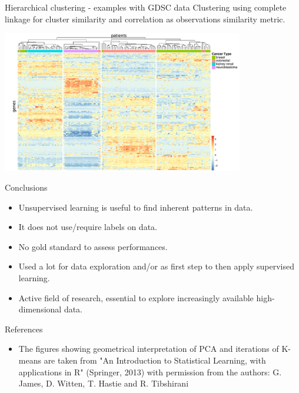 \documentclass[notes]{beamer}          %
\begin{document}
\begin{frame}{Hierarchical clustering - examples with GDSC data}
Clustering using complete linkage for cluster similarity and correlation as observations similarity metric.
\begin{center}
\includegraphics[height=6.2cm]{../figures/week_6/GDSC_heatmap_correlation.pdf}  
\end{center}
\end{frame}

\begin{frame}{Conclusions}
\begin{itemize}
\item Unsupervised learning is useful to find inherent patterns in data. 
\item It does not use/require labels on data. 
\item No gold standard to assess performances.
\item Used a lot for data exploration and/or as first step to then apply supervised learning.
\item Active field of research, essential to explore increasingly available high-dimensional data.
\end{itemize}
\end{frame}




\begin{frame}{References}
\begin{itemize}
\item The figures showing geometrical interpretation of PCA and iterations of K-means are taken from "An Introduction to Statistical Learning, with applications in R"  (Springer, 2013) with permission from the authors: G. James, D. Witten, T. Hastie and R. Tibshirani 
\end{itemize}
\printbibliography
\end{frame}
\end{document}
